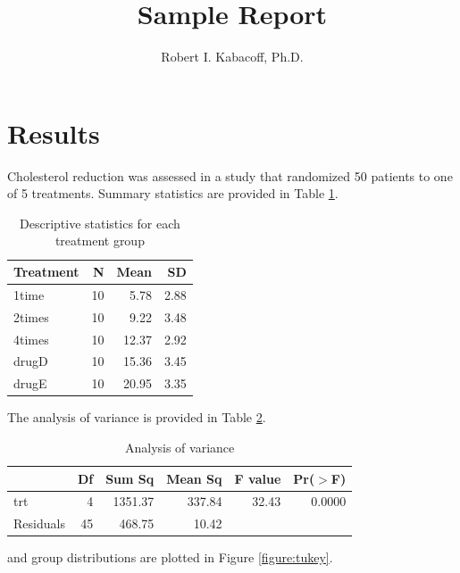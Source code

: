 \documentclass[11pt]{article}\usepackage[]{graphicx}\usepackage[]{xcolor}
\title{Sample Report}
\author{Robert I. Kabacoff, Ph.D.}
\begin{document}
\maketitle


\section{Results}

Cholesterol reduction was assessed in a study 
that randomized 50 patients 
to one of 5 treatments. 
Summary statistics are provided in 
Table \ref{table:descriptives}.

\begin{table}[ht]
\centering
\caption{Descriptive statistics 
for each treatment group} 
\label{table:descriptives}
\begin{tabular}{lrrr}
  \hline
Treatment & N & Mean & SD \\ 
  \hline
1time &  10 & 5.78 & 2.88 \\ 
  2times &  10 & 9.22 & 3.48 \\ 
  4times &  10 & 12.37 & 2.92 \\ 
  drugD &  10 & 15.36 & 3.45 \\ 
  drugE &  10 & 20.95 & 3.35 \\ 
   \hline
\end{tabular}
\end{table}

  
The analysis of variance is provided in Table \ref{table:anova}.

\begin{table}[ht]
\centering
\caption{Analysis of variance} 
\label{table:anova}
\begin{tabular}{lrrrrr}
  \hline
 & Df & Sum Sq & Mean Sq & F value & Pr($>$F) \\ 
  \hline
trt & 4 & 1351.37 & 337.84 & 32.43 & 0.0000 \\ 
  Residuals & 45 & 468.75 & 10.42 &  &  \\ 
   \hline
\end{tabular}
\end{table}

  
\noindent and group distributions are plotted in Figure \ref{figure:tukey}.
\end{document}
